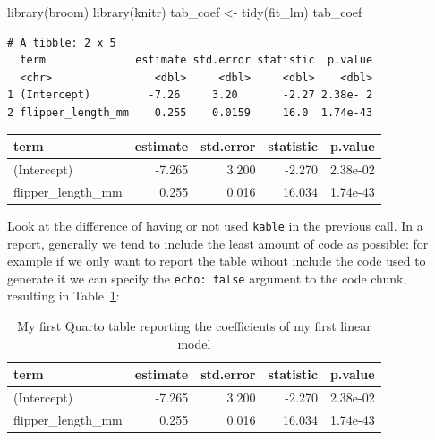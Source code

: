 \documentclass[
  letterpaper,
  DIV=11,
  numbers=noendperiod]{scrartcl}
\newenvironment{Shaded}{\begin{snugshade}}{\end{snugshade}}
\newcommand{\AttributeTok}[1]{\textcolor[rgb]{0.40,0.45,0.13}{#1}}
\newcommand{\DecValTok}[1]{\textcolor[rgb]{0.68,0.00,0.00}{#1}}
\newcommand{\FunctionTok}[1]{\textcolor[rgb]{0.28,0.35,0.67}{#1}}
\newcommand{\NormalTok}[1]{\textcolor[rgb]{0.00,0.23,0.31}{#1}}
\newcommand{\OtherTok}[1]{\textcolor[rgb]{0.00,0.23,0.31}{#1}}
\newcommand{\SpecialCharTok}[1]{\textcolor[rgb]{0.37,0.37,0.37}{#1}}
\newcommand{\StringTok}[1]{\textcolor[rgb]{0.13,0.47,0.30}{#1}}
\begin{document}
\begin{Shaded}
\begin{Highlighting}[]
\FunctionTok{library}\NormalTok{(broom)}
\FunctionTok{library}\NormalTok{(knitr)}
\NormalTok{tab\_coef }\OtherTok{\textless{}{-}} \FunctionTok{tidy}\NormalTok{(fit\_lm)}
\NormalTok{tab\_coef}
\end{Highlighting}
\end{Shaded}

\begin{verbatim}
# A tibble: 2 x 5
  term              estimate std.error statistic  p.value
  <chr>                <dbl>     <dbl>     <dbl>    <dbl>
1 (Intercept)         -7.26     3.20       -2.27 2.38e- 2
2 flipper_length_mm    0.255    0.0159     16.0  1.74e-43
\end{verbatim}

\begin{Shaded}
\end{Shaded}

\begin{longtable}[]{@{}lrrrl@{}}
\toprule\noalign{}
term & estimate & std.error & statistic & p.value \\
\midrule\noalign{}
\endhead
\bottomrule\noalign{}
\endlastfoot
(Intercept) & -7.265 & 3.200 & -2.270 & 2.38e-02 \\
flipper\_length\_mm & 0.255 & 0.016 & 16.034 & 1.74e-43 \\
\end{longtable}

Look at the difference of having or not used \texttt{kable} in the
previous call. In a report, generally we tend to include the least
amount of code as possible: for example if we only want to report the
table wihout include the code used to generate it we can specify the
\texttt{echo:\ false} argument to the code chunk, resulting in
Table~\ref{tbl-coef}:

\begin{longtable}[]{@{}lrrrl@{}}

\caption{\label{tbl-coef}My first Quarto table reporting the
coefficients of my first linear model}

\tabularnewline

\toprule\noalign{}
term & estimate & std.error & statistic & p.value \\
\midrule\noalign{}
\endhead
\bottomrule\noalign{}
\endlastfoot
(Intercept) & -7.265 & 3.200 & -2.270 & 2.38e-02 \\
flipper\_length\_mm & 0.255 & 0.016 & 16.034 & 1.74e-43 \\

\end{longtable}
\end{document}
